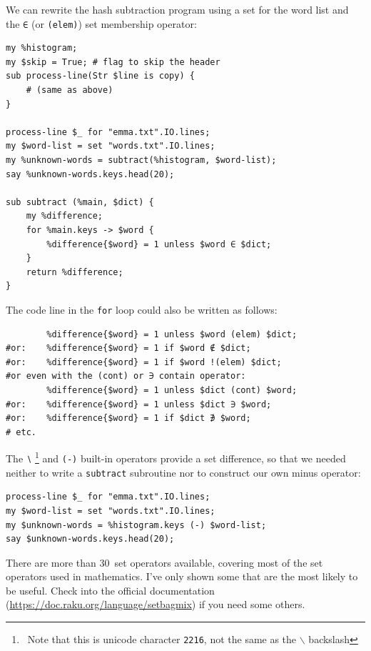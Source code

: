 We can rewrite the hash subtraction program using a set for 
the word list and the  \verb'∈' (or \verb'(elem)') 
set membership operator:

\begin{verbatim}
my %histogram;
my $skip = True; # flag to skip the header
sub process-line(Str $line is copy) {
    # (same as above)
}

process-line $_ for "emma.txt".IO.lines; 
my $word-list = set "words.txt".IO.lines;
my %unknown-words = subtract(%histogram, $word-list);
say %unknown-words.keys.head(20);

sub subtract (%main, $dict) {
	my %difference;
	for %main.keys -> $word {
		%difference{$word} = 1 unless $word ∈ $dict;
	}
	return %difference;
}
\end{verbatim}

The code line in the {\tt for} loop could also be written as follows:

\begin{verbatim}
        %difference{$word} = 1 unless $word (elem) $dict;
#or:    %difference{$word} = 1 if $word ∉ $dict;
#or:    %difference{$word} = 1 if $word !(elem) $dict;
#or even with the (cont) or ∋ contain operator:
        %difference{$word} = 1 unless $dict (cont) $word;
#or:    %difference{$word} = 1 unless $dict ∋ $word;
#or:    %difference{$word} = 1 if $dict ∌ $word;
# etc.
\end{verbatim}

The \verb'∖' \footnote{~Note that this is unicode character {\tt 2216}, 
not the same as the $\backslash$ backslash} and \verb'(-)' built-in operators 
provide a set difference, so that we needed neither to write a 
{\tt subtract} subroutine nor to construct our own minus operator:

\begin{verbatim}
process-line $_ for "emma.txt".IO.lines; 
my $word-list = set "words.txt".IO.lines;
my $unknown-words = %histogram.keys (-) $word-list;
say $unknown-words.keys.head(20);
\end{verbatim}

There are more than 30~set operators available, covering most of 
the set operators used in mathematics. I've only shown 
some that are the most likely to be useful. Check into the 
official documentation (\url{https://doc.raku.org/language/setbagmix}) 
if you need some others.

